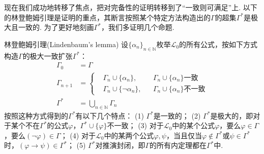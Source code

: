 \documentclass[main.tex]{subfiles}
\begin{document}
现在我们成功地转移了焦点，把对完备性的证明转移到了“一致则可满足”上. 以下的林登鲍姆引理是证明的重点，其断言按照某个特定方法构造出的\(\Gamma\)的超集\(\Gamma^*\)是极大且一致的. 为了更好地刻画\(\Gamma^*\)，我们多证明几个命题.

\begin{lemma}{林登鲍姆引理(Lindenbaum's lemma)}
    设\(\{\alpha_n\}_{n \in \mathbb{N}}\)枚举\(\mathcal{L}_0\)的所有公式，按如下方式构造\(\Gamma\)的极大一致扩张\(\Gamma^*\)：
    \begin{align*}
        \Gamma_0 &= \Gamma \\
        \Gamma_{n+1} &= \left\{ \begin{aligned} & \Gamma_n \cup \{\alpha_n\}, &&\Gamma_n \cup \{\alpha_n\}\mbox{一致} \\ & \Gamma_n \cup \{\neg \alpha_n\}, &&\Gamma_n \cup \{\alpha_n\}\mbox{不一致}\end{aligned} \right. \\
        \Gamma^* &= \bigcup_{n \in \mathbb{N}} \Gamma_n
    \end{align*}
    按照这种方式得到的\(\Gamma^*\)有以下几个特点：\newline
    (1) \(\Gamma^*\)是一致的；\newline
    (2) \(\Gamma^*\)是极大的，即对于某个不在\(\Gamma^*\)的公式\(\varphi\)，\(\Gamma^* \cup \{\varphi\}\)不一致；\newline
    (3) 对于\(\mathcal{L}_0\)中的某个公式\(\varphi\)，要么\(\varphi \in \Gamma\)，要么\((\neg \varphi) \in \Gamma\)；\newline
    (4) 对于\(\mathcal{L}_0\)中的某两个公式\(\varphi, \psi\)，当且仅当\(\varphi \not \in \Gamma^*\)或\(\psi \in \Gamma^*\)时，\((\varphi \to \psi) \in \Gamma^*\)；\newline
    (5) \(\Gamma^*\)对推演封闭，即\(\Gamma\)的所有内定理都在\(\Gamma^*\)中.
\end{lemma}
\end{document}
